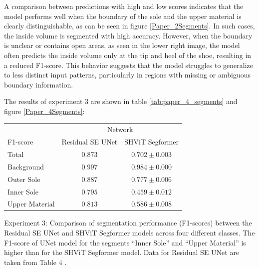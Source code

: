 \medskip

A comparison between predictions with high and low scores indicates that the model performs well when the boundary of the sole and the upper material is clearly distinguishable, as can be seen in figure \ref{Paper_2Segments}. In such cases, the inside volume is segmented with high accuracy. However, when the boundary is unclear or contains open areas, as seen in the lower right image, the model often predicts the inside volume only at the tip and heel of the shoe, resulting in a reduced F1-score. This behavior suggests that the model struggles to generalize to less distinct input patterns, particularly in regions with missing or ambiguous boundary information.

\medskip

The results of experiment 3 are shown in table \ref{tab:paper_4_segments} and figure \ref{Paper_4Segments}:
\begin{center}
	\begin{threeparttable}[H]
		\begin{tabular}{lcc}
			\toprule[1.5pt]  
			& \multicolumn{2}{c}{Network} \\
			\multicolumn{1}{l}{F1-score} & {Residual SE UNet} & {SHViT Segformer} \\
			\midrule
			\midrule
			Total          & $0.873$ & $0.702 \pm 0.003$ \\
			\midrule
			Background     & $0.997$ & $0.984 \pm 0.000$ \\
			Outer Sole     & $0.887$ & $0.777 \pm 0.006$ \\
			Inner Sole     & $0.795$ & $0.459 \pm 0.012$ \\
			Upper Material & $0.813$ & $0.586 \pm 0.008$ \\
			\bottomrule
		\end{tabular}
		\captionsetup{width=0.95\textwidth}
		\caption[Comparison of segmentation performance (F1-scores) between the Residual SE UNet and SHViT Segformer models across four different classes]{Experiment 3: Comparison of segmentation performance (F1-scores) between the Residual SE UNet and SHViT Segformer models across four different classes. The F1-score of UNet model for the segments \enquote{Inner Sole} and \enquote{Upper Material} is higher than for the SHViT Segformer model. Data for Residual SE UNet are taken from Table 4 \cite{contribution_martin_leipert}.}
		\label{tab:paper_4_segments}
	\end{threeparttable}
\end{center}

